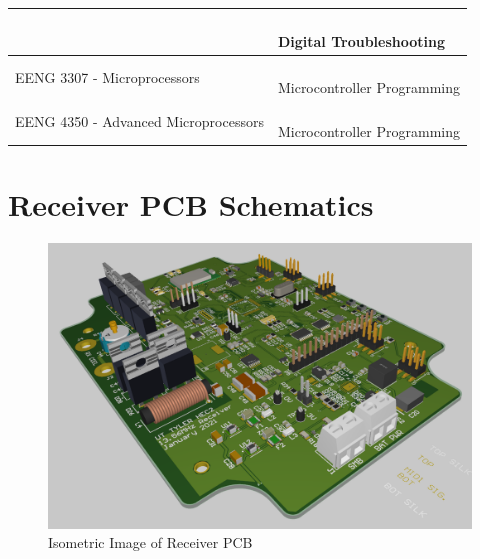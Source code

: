 \documentclass[12pt]{article}
\begin{document}
\begin{appendices}
\begin{table}[h!]
\begin{tabular}{ | l | l | }
{} &   \parbox{0.5\linewidth}{\hfill \\
Digital Troubleshooting
}\\
\hline
\parbox{0.4\linewidth}{\raggedleft
EENG 3307 - Microprocessors
} &   \parbox{0.5\linewidth}{\hfill \\
Microcontroller Programming
}\\
\hline
\parbox{0.4\linewidth}{\raggedleft
EENG 4350 - Advanced Microprocessors
} &   \parbox{0.5\linewidth}{\hfill \\
Microcontroller Programming
}\\
\hline
\end{tabular}
\end{table}
\hfill
\pagebreak

\section{Receiver PCB Schematics}
\hfill
\begin{figure}[h!]
\centering
\includegraphics[angle=270, width=0.85\linewidth]{recv_pcb_img}
\caption{Isometric Image of Receiver PCB}
\end{figure}
\hfill
\pagebreak

\pagebreak

\pagebreak


\end{appendices}
\end{document}
